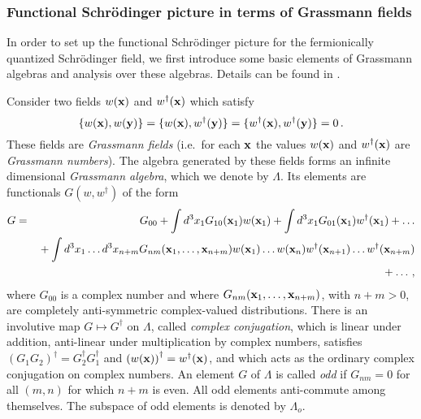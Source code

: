 \documentclass[12pt]{article}
\begin{document}
\subsubsection{Functional Schr{\"o}\-ding\-er picture in terms of Grassmann fields}\label{functschgrassmann}
In order to set up the functional Schr{\"o}\-ding\-er picture for the fermionically quantized Schr{\"o}\-ding\-er field, we first introduce some basic elements of Grassmann algebras and analysis over these algebras. Details can be found in \cite{berezin66,berezin87,dewitt92}.

Consider two fields $w({\bf x})$ and $w^{\dagger}({\bf x})$ which satisfy 
\begin{equation}
\{w({\bf x}),w({\bf y}) \} =\{w({\bf x}),w^{\dagger}({\bf y})\}=\{w^{\dagger}({\bf x}),w^{\dagger}({\bf y})\}=0\,.
\label{fv.1}
\end{equation} 
These fields are {\em Grassmann fields} (i.e.\ for each ${\bf x}$ the values $w({\bf x})$ and $w^{\dagger}({\bf x})$ are {\em Grassmann numbers}). The algebra generated by these fields forms an infinite dimensional {\em Grassmann algebra}, which we denote by $\Lambda$. Its elements are functionals $G(w,w^{\dagger})$ of the form
\begin{eqnarray}
G &=& G_{00} + \int d^3 x_1 G_{10} ({\bf x}_1) w({\bf x}_1) +  \int d^3 x_1 G_{01} ({\bf x}_1) w^\dagger({\bf x}_1) + \dots \nonumber\\
&& \mbox{} + \int d^3 x_1 \dots d^3 x_{n+m} G_{nm} ({\bf x}_1,\dots,{\bf x}_{n+m})  w({\bf x}_1) \dots w({\bf x}_n)  w^\dagger({\bf x}_{n+1}) \dots  w^\dagger({\bf x}_{n+m}) \nonumber\\
&&\mbox{}  +\dots \,,
\label{fv.2}
\end{eqnarray}
where $G_{00}$ is a complex number and where $G_{nm}({\bf x}_1,\dots,{\bf x}_{n+m})$, with $n+m>0$, are completely anti-symmetric complex-valued distributions. There is an involutive map $G \mapsto G^{\dagger}$ on $\Lambda$, called {\em complex conjugation}, which is linear under addition, anti-linear under multiplication by complex numbers, satisfies $(G_1G_2)^\dagger = G^\dagger_2 G^\dagger_1$ and $\left(w({\bf x})\right)^\dagger = w^\dagger({\bf x})$, and which acts as the ordinary complex conjugation on complex numbers. An element $G$ of $\Lambda$ is called {\em odd} if $G_{nm}=0$ for all $(m,n)$ for which $n+m$ is even. All odd elements anti-commute among themselves. The subspace of odd elements is denoted by $\Lambda_o$. 
\end{document}
